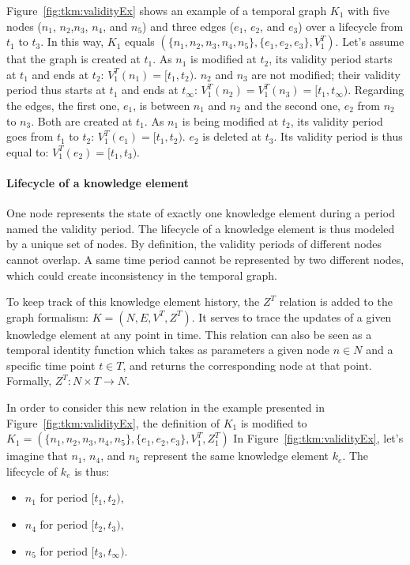 Figure~\ref{fig:tkm:validityEx} shows an example of a temporal graph $K_1$ with five nodes ($n_1$, $n_2$,$n_3$, $n_4$, and $n_5$) and three edges ($e_1$, $e_2$, and  $e_3$) over a lifecycle from $t_1$ to $t_3$.
In this way, $K_1$ equals $(\{n_1, n_2, n_3, n_4, n_5\}, \{e_1, e_2, e_3\}, V^{T}_1)$.
Let's assume that the graph is created at $t_1$.
As $n_1$ is modified at $t_2$, its validity period starts at $t_1$ and ends at $t_2$: $V^{T}_1(n_1) = [t_1, t_2)$.
$n_2$ and $n_3$ are not modified; their validity period thus starts at $t_1$ and ends at $t_\infty$: $V^{T}_1(n_2) = V^{T}_1(n_3) = [t_1, t_\infty)$.
Regarding the edges, the first one, $e_1$, is between $n_1$ and $n_2$ and the second one, $e_2$ from $n_2$ to $n_3$.
Both are created at $t_1$.
As $n_1$ is being modified at $t_2$, its validity period goes from $t_1$ to $t_2$:  $V^{T}_1(e_1) = [t_1, t_2)$.
$e_2$ is deleted at $t_3$.
Its validity period is thus equal to: $V^{T}_1(e_2) = [t_1, t_3)$.

\paragraph{Lifecycle of a knowledge element}
One node represents the state of exactly one knowledge element during a period named the validity period.
The lifecycle of a knowledge element is thus modeled by a unique set of nodes.
By definition, the validity periods of different nodes cannot overlap.
A same time period cannot be represented by two different nodes, which could create inconsistency in the temporal graph.

To keep track of this knowledge element history, the $Z^T$ relation is added to the graph formalism: $K = (N, E, V^T, Z^T)$.
It serves to trace the updates of a given knowledge element at any point in time. 
This relation can also be seen as a temporal identity function which takes as parameters a given node $n \in N$ and a specific time point $t \in T$, and returns the corresponding node at that point. 
Formally, $Z^T: N \times T \rightarrow N$. 

In order to consider this new relation in the example presented in Figure~\ref{fig:tkm:validityEx}, the definition of $K_1$ is modified to $K_1 = (\{n_1, n_2, n_3, n_4, n_5\}, \{e_1, e_2, e_3\}, V^{T}_1, Z^{T}_1)$
In Figure~\ref{fig:tkm:validityEx}, let's imagine that $n_1$, $n_4$, and $n_5$ represent the same knowledge element $k_e$.
The lifecycle of $k_e$ is thus:
\begin{itemize}
    \item $n_1$ for period $[t_1, t_2)$,
    \item $n_4$ for period $[t_2, t_3)$,
    \item $n_5$ for period $[t_3, t_\infty)$.
\end{itemize}

